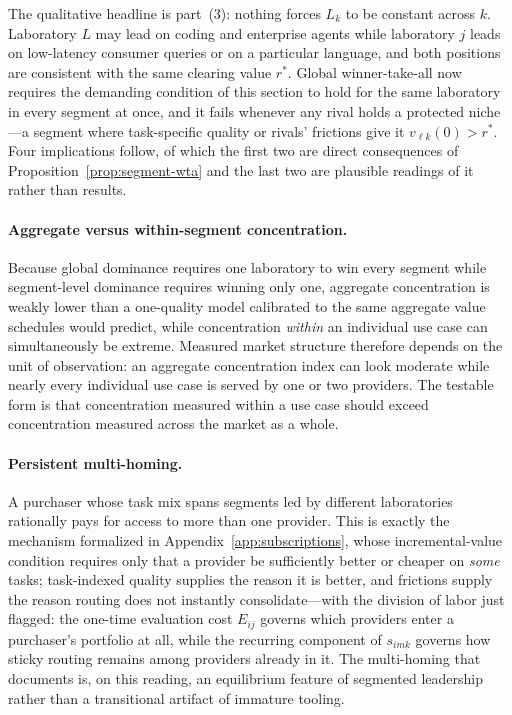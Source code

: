 \documentclass[11pt]{article}
\begin{document}
The qualitative headline is part~(3): nothing forces $L_k$ to be constant across $k$. Laboratory $L$ may lead on coding and enterprise agents while laboratory $j$ leads on low-latency consumer queries or on a particular language, and both positions are consistent with the same clearing value $r^*$. Global winner-take-all now requires the demanding condition of this section to hold for the same laboratory in every segment at once, and it fails whenever any rival holds a protected niche---a segment where task-specific quality or rivals' frictions give it $v_{\ell k}(0)>r^*$. Four implications follow, of which the first two are direct consequences of Proposition~\ref{prop:segment-wta} and the last two are plausible readings of it rather than results.

\paragraph{Aggregate versus within-segment concentration.} Because global dominance requires one laboratory to win every segment while segment-level dominance requires winning only one, aggregate concentration is weakly lower than a one-quality model calibrated to the same aggregate value schedules would predict, while concentration \emph{within} an individual use case can simultaneously be extreme. Measured market structure therefore depends on the unit of observation: an aggregate concentration index can look moderate while nearly every individual use case is served by one or two providers. The testable form is that concentration measured within a use case should exceed concentration measured across the market as a whole.

\paragraph{Persistent multi-homing.} A purchaser whose task mix spans segments led by different laboratories rationally pays for access to more than one provider. This is exactly the mechanism formalized in Appendix~\ref{app:subscriptions}, whose incremental-value condition requires only that a provider be sufficiently better or cheaper on \emph{some} tasks; task-indexed quality supplies the reason it is better, and frictions supply the reason routing does not instantly consolidate---with the division of labor just flagged: the one-time evaluation cost $E_{ij}$ governs which providers enter a purchaser's portfolio at all, while the recurring component of $s_{imk}$ governs how sticky routing remains among providers already in it. The multi-homing that \citet{fradkin2025demand} documents is, on this reading, an equilibrium feature of segmented leadership rather than a transitional artifact of immature tooling.
\end{document}
